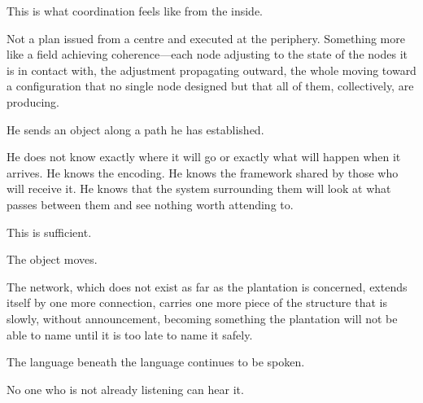 This is what coordination feels like from the inside.

Not a plan issued from a centre and executed at the periphery.
Something more like a field achieving coherence---each node
adjusting to the state of the nodes it is in contact with,
the adjustment propagating outward, the whole moving toward
a configuration that no single node designed but that all
of them, collectively, are producing.

He sends an object along a path he has established.

He does not know exactly where it will go or exactly what
will happen when it arrives. He knows the encoding. He knows
the framework shared by those who will receive it. He knows
that the system surrounding them will look at what passes
between them and see nothing worth attending to.

This is sufficient.

The object moves.

The network, which does not exist as far as the plantation
is concerned, extends itself by one more connection, carries
one more piece of the structure that is slowly, without
announcement, becoming something the plantation will not
be able to name until it is too late to name it safely.

The language beneath the language continues to be spoken.

No one who is not already listening can hear it.

